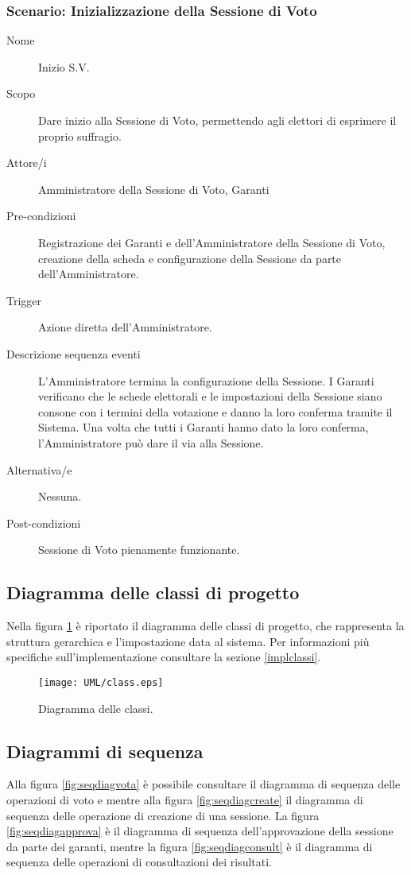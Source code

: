 \subsubsection{Scenario: Inizializzazione della Sessione di Voto}
\begin{description}
	\item[Nome] Inizio S.V.
	\item[Scopo] Dare inizio alla Sessione di Voto, permettendo agli elettori di esprimere il proprio suffragio.
	\item[Attore/i] Amministratore della Sessione di Voto, Garanti
	\item[Pre-condizioni] Registrazione dei Garanti e dell'Amministratore della Sessione di Voto, creazione della scheda e configurazione della Sessione da parte dell'Amministratore.
	\item[Trigger] Azione diretta dell'Amministratore.
	\item[Descrizione sequenza eventi] L'Amministratore termina la configurazione della Sessione. I Garanti verificano che le schede elettorali e le impostazioni della Sessione siano consone con i termini della votazione e danno la loro conferma tramite il Sistema. Una volta che tutti i Garanti hanno dato la loro conferma, l'Amministratore può dare il via alla Sessione.
	\item[Alternativa/e] Nessuna.
	\item[Post-condizioni] Sessione di Voto pienamente funzionante.
\end{description}


\subsection{Diagramma delle classi di progetto}
\label{subsec:projclassdiag}
Nella figura \ref{fig:classdiag} è riportato il diagramma delle classi di progetto, che rappresenta la struttura gerarchica e l'impostazione data al sistema. Per informazioni più specifiche sull'implementazione consultare la sezione \ref{implclassi}.
\begin{figure}[ht]
	\centering
	\texttt{[image: UML/class.eps]}
	\caption{Diagramma delle classi.}
	\label{fig:classdiag}
\end{figure}



\subsection{Diagrammi di sequenza}
Alla figura \ref{fig:seqdiagvota} è possibile consultare il diagramma di sequenza delle operazioni di voto e mentre alla figura \ref{fig:seqdiagcreate} il diagramma di sequenza delle operazione di creazione di una sessione.
La figura \ref{fig:seqdiagapprova} è il diagramma di sequenza dell'approvazione della sessione da parte dei garanti, mentre la figura \ref{fig:seqdiagconsult} è il diagramma di sequenza delle operazioni di consultazioni dei risultati.

